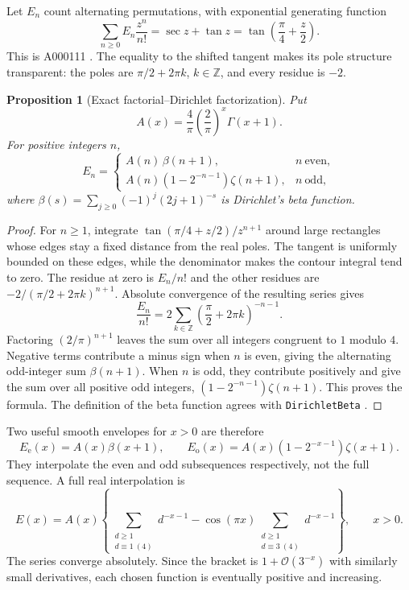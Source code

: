 \documentclass[11pt,a4paper]{article}
\numberwithin{equation}{section}
\newtheorem{proposition}[theorem]{Proposition}
\theoremstyle{definition}
\theoremstyle{remark}
\newcommand{\bigO}{\mathcal O}
\begin{document}
Let $E_n$ count alternating permutations, with exponential generating function
\begin{equation}
 \sum_{n\ge0}E_n\frac{z^n}{n!}=\sec z+\tan z
   =\tan\left(\frac\pi4+\frac z2\right).
 \label{eq:zigzag-egf}
\end{equation}
This is A000111 \cite{oeiszigzag}. The equality to the shifted tangent makes its pole structure transparent: the poles are $\pi/2+2\pi k$, $k\in\mathbb Z$, and every residue is $-2$.

\begin{proposition}[Exact factorial--Dirichlet factorization]
\label{prop:zigzag-dirichlet}
Put
\begin{equation}
 A(x)=\frac4\pi\left(\frac2\pi\right)^x\Gamma(x+1).
 \label{eq:zigzag-A}
\end{equation}
For positive integers $n$,
\begin{equation}
 E_n=\begin{cases}
 A(n)\,\beta(n+1),&n\ \text{even},\\
 A(n)(1-2^{-n-1})\zeta(n+1),&n\ \text{odd},
 \end{cases}
 \label{eq:zigzag-parity}
\end{equation}
where $\beta(s)=\sum_{j\ge0}(-1)^j(2j+1)^{-s}$ is Dirichlet's beta function.
\end{proposition}
\begin{proof}
For $n\ge1$, integrate
$\tan(\pi/4+z/2)/z^{n+1}$ around large rectangles whose edges stay a fixed distance from the real poles. The tangent is uniformly bounded on these edges, while the denominator makes the contour integral tend to zero. The residue at zero is $E_n/n!$ and the other residues are $-2/(\pi/2+2\pi k)^{n+1}$. Absolute convergence of the resulting series gives
\[
 \frac{E_n}{n!}=2\sum_{k\in\mathbb Z}
                 \left(\frac\pi2+2\pi k\right)^{-n-1}.
\]
Factoring $(2/\pi)^{n+1}$ leaves the sum over all integers congruent to $1$ modulo $4$. Negative terms contribute a minus sign when $n$ is even, giving the alternating odd-integer sum $\beta(n+1)$. When $n$ is odd, they contribute positively and give the sum over all positive odd integers, $(1-2^{-n-1})\zeta(n+1)$. This proves the formula. The definition of the beta function agrees with \texttt{DirichletBeta} \cite{wlbeta}.
\end{proof}

Two useful smooth envelopes for $x>0$ are therefore
\begin{equation}
 E_{\mathrm e}(x)=A(x)\beta(x+1),\qquad
 E_{\mathrm o}(x)=A(x)(1-2^{-x-1})\zeta(x+1).
 \label{eq:zigzag-envelopes}
\end{equation}
They interpolate the even and odd subsequences respectively, not the full sequence. A full real interpolation is
\begin{equation}
 E(x)=A(x)\left\{
 \sum_{\substack{d\ge1\\d\equiv1\ (4)}}d^{-x-1}
 -\cos(\pi x)\sum_{\substack{d\ge1\\d\equiv3\ (4)}}d^{-x-1}
 \right\},\qquad x>0.
 \label{eq:zigzag-cont}
\end{equation}
The series converge absolutely. Since the bracket is $1+\bigO(3^{-x})$ with similarly small derivatives, each chosen function is eventually positive and increasing.
\end{document}
